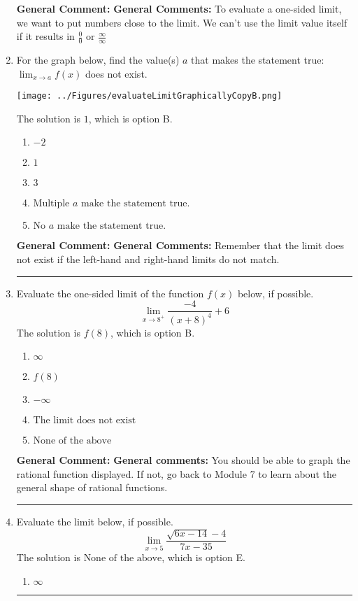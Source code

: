 \documentclass{extbook}[14pt]
\newcommand{\litem}[1]{\item #1

\rule{\textwidth}{0.4pt}}
\begin{document}
\begin{enumerate}
{\textbf{General Comment:} \textbf{General Comments:} To evaluate a one-sided limit, we want to put numbers close to the limit. We can't use the limit value itself if it results in $\frac{0}{0}$ or $\frac{\infty}{\infty}$
}
\litem{
For the graph below, find the value(s) $a$ that makes the statement true: $ \displaystyle \lim_{x \rightarrow a} f(x)$ does not exist.

\begin{center}
    \texttt{[image: ../Figures/evaluateLimitGraphicallyCopyB.png]}
\end{center}


The solution is \( 1 \), which is option B.\begin{enumerate}[label=\Alph*.]
\item \( -2 \)


\item \( 1 \)


\item \( 3 \)


\item \( \text{Multiple } a \text{ make the statement true}. \)


\item \( \text{No } a \text{ make the statement true}. \)


\end{enumerate}

\textbf{General Comment:} \textbf{General Comments:} Remember that the limit does not exist if the left-hand and right-hand limits do not match.
}
\litem{
Evaluate the one-sided limit of the function $f(x)$ below, if possible.
\[ \lim_{x \rightarrow 8^+} \frac{-4}{(x+8)^4}+6 \]The solution is \( f(8) \), which is option B.\begin{enumerate}[label=\Alph*.]
\item \( \infty \)


\item \( f(8) \)


\item \( -\infty \)


\item \( \text{The limit does not exist} \)


\item \( \text{None of the above} \)


\end{enumerate}

\textbf{General Comment:} \textbf{General comments:} You should be able to graph the rational function displayed. If not, go back to Module 7 to learn about the general shape of rational functions.
}
\litem{
Evaluate the limit below, if possible.
\[ \lim_{x \rightarrow 5} \frac{\sqrt{6x - 14} - 4}{7x - 35} \]The solution is \( \text{None of the above} \), which is option E.\begin{enumerate}[label=\Alph*.]
\item \( \infty \)


\end{enumerate}}
\end{enumerate}
\end{document}
